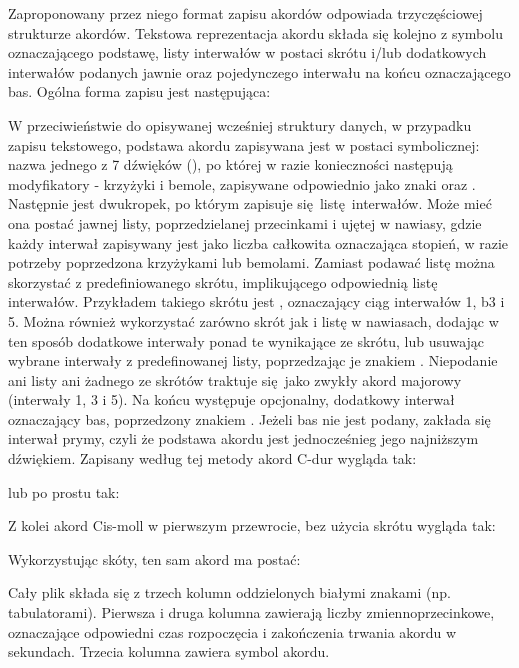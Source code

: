Zaproponowany przez niego format zapisu akordów odpowiada trzyczęściowej strukturze akordów.
Tekstowa reprezentacja akordu składa się kolejno z symbolu oznaczającego podstawę, listy interwałów
w postaci skrótu i/lub dodatkowych interwałów podanych jawnie oraz pojedynczego interwału na końcu
oznaczającego bas. Ogólna forma zapisu jest następująca: 
\begin{center}
\end{center}
W przeciwieństwie do opisywanej wcześniej struktury danych, w przypadku zapisu tekstowego, podstawa
akordu zapisywana jest w postaci symbolicznej: nazwa jednego z 7 dźwięków (), po której w
razie konieczności następują modyfikatory - krzyżyki i bemole, zapisywane odpowiednio jako znaki
\code{\#} oraz . Następnie jest dwukropek, po którym zapisuje się listę interwałów. Może mieć ona
postać jawnej listy, poprzedzielanej przecinkami i ujętej w nawiasy, gdzie każdy interwał zapisywany
jest jako liczba całkowita oznaczająca stopień, w razie potrzeby poprzedzona krzyżykami lub
bemolami. Zamiast podawać listę można skorzystać z predefiniowanego skrótu, implikującego
odpowiednią listę interwałów. Przykładem takiego skrótu jest , oznaczający ciąg interwałów
1, b3 i 5. Można również wykorzystać zarówno skrót jak i listę w nawiasach, dodając w ten
sposób dodatkowe interwały ponad te wynikające ze skrótu, lub usuwając wybrane interwały z
predefinowanej listy, poprzedzając je znakiem \code{*}. Niepodanie ani listy ani żadnego ze skrótów
traktuje się jako zwykły akord majorowy (interwały 1, 3 i 5). Na końcu występuje opcjonalny,
dodatkowy interwał oznaczający bas, poprzedzony znakiem \code{/}. Jeżeli bas nie jest podany, zakłada
się interwał prymy, czyli że podstawa akordu jest jednocześnieg jego najniższym dźwiękiem. Zapisany
według tej metody akord C-dur wygląda tak:
\begin{center}
\end{center}
lub po prostu tak:
\begin{center}
\end{center}
Z kolei akord Cis-moll w pierwszym przewrocie, bez użycia skrótu wygląda tak:
\begin{center}
\end{center}
Wykorzystując skóty, ten sam akord ma postać:
\begin{center}
\end{center}
Cały plik  składa się z trzech kolumn oddzielonych białymi znakami (np. tabulatorami).
Pierwsza i druga kolumna zawierają liczby zmiennoprzecinkowe, oznaczające odpowiedni czas
rozpoczęcia i zakończenia trwania akordu w sekundach. Trzecia kolumna zawiera symbol akordu.

